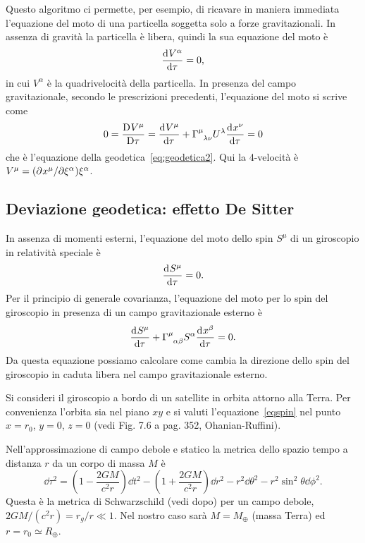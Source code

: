 Questo algoritmo ci permette, per esempio, di ricavare in maniera immediata
l'equazione del moto di una particella soggetta solo a forze gravitazionali.  In
assenza di gravità la particella è libera, quindi la sua equazione del moto è
\begin{equation}
  \frac{{\mathop{}\!\mathrm{d}^{}}V^{\alpha}}{\mathop{}\!\mathrm{d} {\tau}^{}} = 0,
\end{equation}
in cui $V^{\alpha}$ è la quadrivelocità della particella.  In
presenza del campo gravitazionale, secondo le prescrizioni precedenti,
l'equazione del moto si scrive come
\begin{equation}
  0 = \curder{V^{\mu}} = \toder{V^{\mu}}{\tau} +
  \tensor{\Gamma}{^{\mu}_{\lambda\nu}} U^{\lambda} \toder{x^{\nu}}{\tau} = 0
\end{equation}
che è l'equazione della
geodetica~\eqref{eq:geodetica2}.  Qui la 4-velocità è $V^{\mu} =
(\partial^{} x^{\mu} / \partial {\xi^{\alpha}}^{}) \xi^{\alpha}$.

\subsection{Deviazione geodetica: effetto De Sitter}
\label{sec:effetto-de-sitter}

In assenza di momenti esterni, l'equazione del moto dello spin $S^{\mu}$ di un
giroscopio in relatività speciale è
\begin{equation}
  \frac{{\mathop{}\!\mathrm{d}^{}}S^{\mu}}{\mathop{}\!\mathrm{d} {\tau}^{}} = 0.
\end{equation}
Per il principio di generale covarianza, l'equazione del moto per lo spin del
giroscopio in presenza di un campo gravitazionale esterno è
\begin{equation}
  \toder{S^{\mu}}{\tau} + \tensor{\Gamma}{^{\mu}_{\alpha\beta}} S^{\alpha}
  \toder{x^{\beta}}{\tau}= 0.
  \label{eqspin}
\end{equation}
Da questa equazione possiamo calcolare come cambia la direzione dello spin del
giroscopio in caduta libera nel campo gravitazionale esterno.

Si consideri il giroscopio a bordo di un satellite in orbita attorno alla Terra.
Per convenienza l'orbita sia nel piano $xy$ e si valuti
l'equazione~\eqref{eqspin} nel punto $x=r_0$, $y=0$, $z=0$ (vedi Fig. 7.6 a
pag. 352, Ohanian-Ruffini).

Nell'approssimazione di campo debole e statico la metrica dello spazio tempo a
distanza $r$ da un corpo di massa $M$ è
\begin{equation}
  \dd\tau^2 = \left(1-\frac{2 G M}{c^2r}\right) \dd t^2 - \left(1+\frac{2 G
      M}{c^2r}\right) \dd r^2 - r^2 \dd \theta^2 - r^2 \sin^2 \theta \dd \phi^2.
  \label{metricadebole}
\end{equation}
Questa è la metrica di Schwarzschild (vedi dopo) per un campo debole, $2GM/(c^2
r) = r_{g}/r\ll 1$.  Nel nostro caso sarà $M=M_{\oplus}$ (massa Terra) ed $r=
r_0 \simeq R_{\oplus}$.

